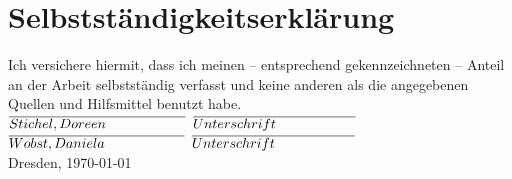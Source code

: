 \section{Selbstständigkeitserklärung}
\label{sec:Selbstständigkeitserklärung}

Ich versichere hiermit, dass ich meinen -- entsprechend gekennzeichneten -- Anteil an der Arbeit selbstständig verfasst und keine anderen als die angegebenen Quellen und Hilfsmittel benutzt habe.\\[2cm]

$\overline{Stichel, Doreen\hphantom{spaces}\hphantom{spaces}}$ \hfill $\overline{Unterschrift\hphantom{spaces}\hphantom{spaces}}$\\[1cm]

$\overline{Wobst, Daniela\hphantom{spaces}\hphantom{spaces}}$ \hfill $\overline{Unterschrift\hphantom{spaces}\hphantom{spaces}}$\\[2cm]

Dresden, \today